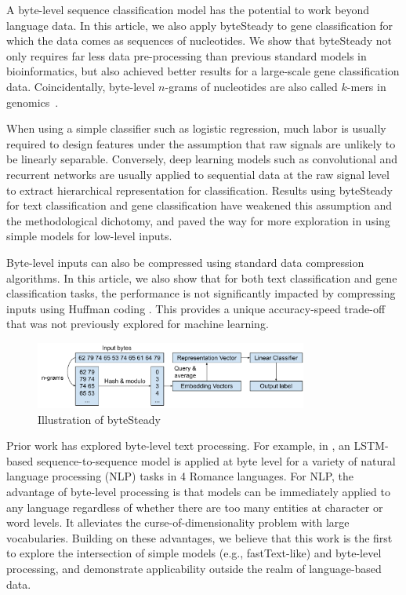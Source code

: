 \documentclass[sigconf,review, anonymous]{acmart}
\begin{document}
A byte-level sequence classification model has the potential to work beyond language data. In this article, we also apply byteSteady to gene classification for which the data comes as sequences of nucleotides. We show that byteSteady not only requires far less data pre-processing than previous standard models in bioinformatics, but also achieved better results for a large-scale gene classification data. Coincidentally, byte-level \(n\)-grams of nucleotides are also called \(k\)-mers in genomics~\cite{bonham2014alignment}.

When using a simple classifier such as logistic regression, much labor is usually required to design features under the assumption that raw signals are unlikely to be linearly separable. Conversely, deep learning models such as convolutional and recurrent networks are usually applied to sequential data at the raw signal level to extract hierarchical representation for classification. Results using byteSteady for text classification and gene classification have weakened this assumption and the methodological dichotomy, and paved the way for more exploration in using simple models for low-level inputs.

Byte-level inputs can also be compressed using standard data compression algorithms. In this article, we also show that for both text classification and gene classification tasks, the performance is not significantly impacted by compressing inputs using Huffman coding \cite{H52}. This provides a unique accuracy-speed trade-off that was not previously explored for machine learning.

\begin{figure}[t]
  \centering
  \includegraphics[width=0.8\textwidth]{model}
  \caption{Illustration of byteSteady}
  \label{fig:model}
\end{figure}

Prior work has explored byte-level text processing. For example, in \cite{GBVS16}, an LSTM-based \cite{HS97} sequence-to-sequence \cite{CMGBBSB14} \cite{SVL14} model is applied at byte level for a variety of natural language processing (NLP) tasks in 4 Romance languages. For NLP, the advantage of byte-level processing is that models can be immediately applied to any language regardless of whether there are too many entities at character or word levels. It alleviates the curse-of-dimensionality problem \cite{BDVJ03} with large vocabularies. Building on these advantages, we believe that this work is the first to explore the intersection of simple models (e.g., fastText-like) and byte-level processing, and demonstrate applicability outside the realm of language-based data.
\end{document}
